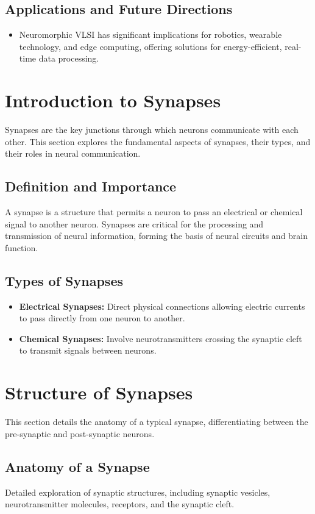 \documentclass{article}
\begin{document}
\subsection{Applications and Future Directions}
\begin{itemize}
    \item Neuromorphic VLSI has significant implications for robotics, wearable technology, and edge computing, offering solutions for energy-efficient, real-time data processing.
\end{itemize}


\section{Introduction to Synapses}
Synapses are the key junctions through which neurons communicate with each other. This section explores the fundamental aspects of synapses, their types, and their roles in neural communication.

\subsection{Definition and Importance}
A synapse is a structure that permits a neuron to pass an electrical or chemical signal to another neuron. Synapses are critical for the processing and transmission of neural information, forming the basis of neural circuits and brain function.

\subsection{Types of Synapses}
\begin{itemize}
    \item \textbf{Electrical Synapses:} Direct physical connections allowing electric currents to pass directly from one neuron to another.
    \item \textbf{Chemical Synapses:} Involve neurotransmitters crossing the synaptic cleft to transmit signals between neurons.
\end{itemize}

\section{Structure of Synapses}
This section details the anatomy of a typical synapse, differentiating between the pre-synaptic and post-synaptic neurons.

\subsection{Anatomy of a Synapse}
Detailed exploration of synaptic structures, including synaptic vesicles, neurotransmitter molecules, receptors, and the synaptic cleft.
\end{document}
